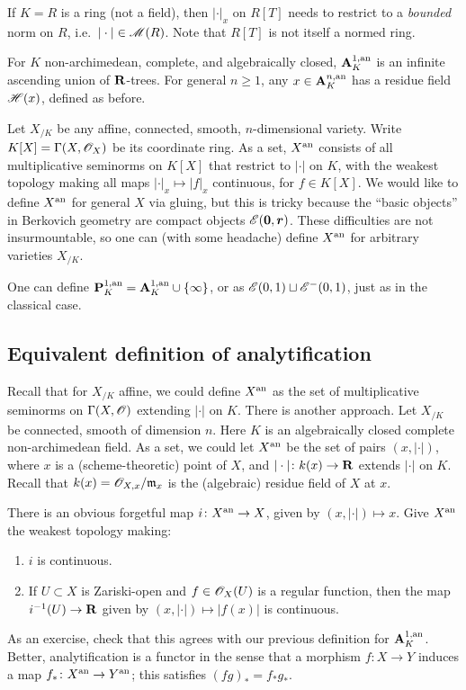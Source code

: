 If $K=R$ is a ring (not a field), then $|\cdot|_x$ on $R[T]$ needs to restrict 
to a \emph{bounded} norm on $R$, i.e.~$|\cdot|\in \operatorname{\mathscr{M}}(R)$. Note that 
$R[T]$ is not itself a normed ring. 

For $K$ non-archimedean, complete, and algebraically closed, $\mathbf{A}_K^{1,\mathrm{an}}$ is 
an infinite ascending union of $\mathbf{R}$-trees. For general $n\geqslant 1$, any 
$x\in \mathbf{A}_K^{n,\mathrm{an}}$ has a residue field $\mathscr{H}(x)$, defined as before. 

Let $X_{/K}$ be any affine, connected, smooth, $n$-dimensional variety. Write 
$K[X]=\Gamma(X,\mathscr{O}_X)$ be its coordinate ring. As a set, $X^{\mathrm{an}}$ consists of 
all multiplicative seminorms on $K[X]$ that restrict to $|\cdot|$ on $K$, with 
the weakest topology making all maps $|\cdot|_x\mapsto |f|_x$ continuous, for 
$f\in K[X]$. We would like to define $X^{\mathrm{an}}$ for general $X$ via gluing, but 
this is tricky because the ``basic objects'' in Berkovich geometry are compact 
objects $\mathscr{E}(\bm 0,\bm r)$. These difficulties are not insurmountable, so one 
can (with some headache) define $X^{\mathrm{an}}$ for arbitrary varieties $X_{/K}$. 

One can define $\mathbf{P}_K^{1,\mathrm{an}}=\mathbf{A}_K^{1,\mathrm{an}}\cup\{\infty\}$, or as 
$\mathscr{E}(0,1)\sqcup \mathscr{E}^-(0,1)$, just as in the classical case. 





\subsection{Equivalent definition of analytification}

Recall that for $X_{/K}$ affine, we could define $X^{\mathrm{an}}$ as the set of 
multiplicative seminorms on $\Gamma(X,\mathscr{O})$ extending $|\cdot|$ on $K$. There 
is another approach. Let $X_{/K}$ be connected, smooth of dimension $n$. Here 
$K$ is an algebraically closed complete non-archimedean field. As a set, we 
could let $X^{\mathrm{an}}$ be the set of pairs $(x,|\cdot|)$, where $x$ is a 
(scheme-theoretic) point of $X$, and $|\cdot|\colon k(x)\to \mathbf{R}$ extends 
$|\cdot|$ on $K$. Recall that $k(x)=\mathscr{O}_{X,x}/\mathfrak{m}_x$ is the (algebraic) 
residue field of $X$ at $x$. 

There is an obvious forgetful map $i\colon X^{\mathrm{an}}\to X$, given by 
$(x,|\cdot|)\mapsto x$. Give $X^{\mathrm{an}}$ the weakest topology making: 
\begin{enumerate}
\item
$i$ is continuous.

\item
If $U\subset X$ is Zariski-open and $f\in \mathscr{O}_X(U)$ is a regular function, then 
the map $i^{-1}(U)\to \mathbf{R}$ given by $(x,|\cdot|)\mapsto |f(x)|$ is continuous. 
\end{enumerate}
As an exercise, check that this agrees with our previous definition for 
$\mathbf{A}_K^{1,\mathrm{an}}$. Better, analytification is a functor in the sense that a 
morphism $f\colon X\to Y$ induces a map $f_\ast\colon X^{\mathrm{an}}\to Y^{\mathrm{an}}$; this 
satisfies $(f g)_\ast = f_\ast g_\ast$. 





